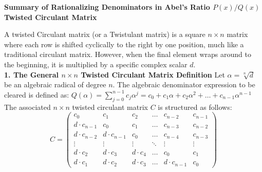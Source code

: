 {\bf Summary of Rationalizing Denominators in Abel's Ratio $P(x)/Q(x)$}\\

{\bf Twisted Circulant Matrix}

A twisted Circulant matrix (or a Twistulant matrix) is a square $n \times n$ matrix where each row is shifted cyclically to the right by one position, much like a traditional circulant matrix. 
However, when the final element wraps around to the beginning, it is multiplied by a specific complex scalar $d$. \\


{\bf 1. The General \(n \times n\) Twisted Circulant Matrix Definition}
Let \(\alpha = \sqrt[n]{d}\) be an algebraic radical of degree \(n\). 
The algebraic denominator expression to be cleared is defined as:
\(Q(\alpha )=\sum _{j=0}^{n-1}c_{j}\alpha ^{j}=c_{0}+c_{1}\alpha +c_{2}\alpha ^{2}+\dots +c_{n-1}\alpha ^{n-1}\)
The associated \(n \times n\) twisted circulant matrix \(C\) is structured as follows:
\[C=\left(\begin{matrix}c_{0}&c_{1}&c_{2}&\dots &c_{n-2}&c_{n-1}\\ 
d\cdot c_{n-1}&c_{0}&c_{1}&\dots &c_{n-3}&c_{n-2}                     \\ 
d\cdot c_{n-2}&d\cdot c_{n-1}&c_{0}&\dots &c_{n-4}&c_{n-3}      \\ 
\vdots &\vdots &\vdots &\ddots &\vdots &\vdots                           \\ d\cdot c_{2}&d\cdot c_{3}&d\cdot c_{4}&\dots &c_{0}&c_{1}\\
 d\cdot c_{1}&d\cdot c_{2}&d\cdot c_{3}&\dots &d\cdot c_{n-1}&c_{0}
 \end{matrix}\right)\] 


